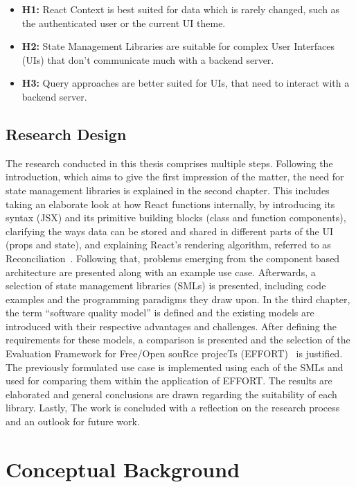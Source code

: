 \begin{itemize}
\tightlist
\item
  \textbf{H1:} React Context is best suited for data which is rarely
  changed, such as the authenticated user or the current UI theme.
\item
  \textbf{H2:} State Management Libraries are suitable for complex User
  Interfaces (UIs) that don't communicate much with a backend server.
\item
  \textbf{H3:} Query approaches are better suited for UIs, that need to
  interact with a backend server.
\end{itemize}

\hypertarget{research-design}{%
\section{Research Design}\label{research-design}}

The research conducted in this thesis comprises multiple steps.
Following the introduction, which aims to give the first impression of
the matter, the need for state management libraries is explained in the
second chapter. This includes taking an
elaborate look at how React functions internally, by introducing its syntax (JSX)
and its primitive building blocks (class and function components),
clarifying the ways data can be stored and shared in different
parts of the UI (props and state), and explaining React's rendering
algorithm, referred to as Reconciliation~\cite{react_reconciliation}.
Following that, problems emerging from the component based
architecture are presented along with an example use case. Afterwards, a
selection of state management libraries (SMLs) is presented, including code
examples and the programming paradigms they draw upon. In the third
chapter, the term ``software quality model'' is defined and the existing
models are introduced with their respective advantages and challenges.
After defining the requirements for these models, a comparison is presented
and the selection of the Evaluation Framework for Free/Open souRce projecTs
(EFFORT)~\cite{effort} is
justified. The previously formulated use case is implemented using each
of the SMLs and used for comparing them within the application of
EFFORT. The results are elaborated and general conclusions are drawn
regarding the suitability of each library. Lastly, The work is concluded
with a reflection on the research process and an outlook for future
work.

\clearpage
\hypertarget{conceptual-background}{%
\chapter{Conceptual Background}\label{conceptual-background}}

